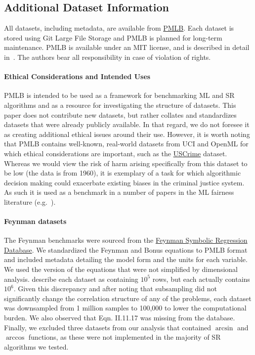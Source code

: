 \subsection{Additional Dataset Information}

All datasets, including metadata, are available from \href{https://epistasislab.github.io/pmlb/}{PMLB}. 
Each dataset is stored using Git Large File Storage and PMLB is planned for long-term maintenance.
PMLB is available under an MIT license, and is described in detail in~\citet{romanoPMLBV1Open2021}. 
The authors bear all responsibility in case of violation of rights.

\paragraph{Ethical Considerations and Intended Uses}
PMLB is intended to be used as a framework for benchmarking ML and SR algorithms and as a resource for investigating the structure of datasets. 
This paper does not contribute new datasets, but rather collates and standardizes datasets that were already publicly available.
In that regard, we do not foresee it as creating additional ethical issues around their use. 
However, it is worth noting that PMLB contains well-known, real-world datasets from UCI and OpenML for which ethical considerations are important, such as the \href{https://github.com/EpistasisLab/pmlb/blob/master/datasets/1089_USCrime/metadata.yaml}{USCrime} dataset. 
Whereas we would view the risk of harm arising specifically from this dataset to be low (the data is from 1960), it is exemplary of a task for which algorithmic decision making could exacerbate existing biases in the criminal justice system.  
As such it is used as a benchmark in a number of papers in the ML fairness literature (e.g.~\cite{kearnsPreventingFairnessGerrymandering2018}). 


\paragraph{Feynman datasets}
The Feynman benchmarks were sourced from the \href{https://space.mit.edu/home/tegmark/aifeynman.html}{Feynman Symbolic Regression Database}. 
We standardized the Feynman and Bonus equations to PMLB format and included metadata detailing the model form and the units for each variable. 
We used the version of the equations that were not simplified by dimensional analysis. 
\citet{udrescuAIFeynmanPhysicsInspired2020} describe each dataset as containing $10^5$ rows, but each actually contains $10^6$. 
Given this discrepancy and after noting that subsampling did not significantly change the correlation structure of any of the problems, each dataset was downsampled from 1 million samples to 100,000 to lower the computational burden.
We also observed that Eqn. II.11.17 was missing from the database. 
Finally, we excluded three datasets from our analysis that contained $\arcsin$ and $\arccos$ functions, as these were not implemented in the majority of SR algorithms we tested.

